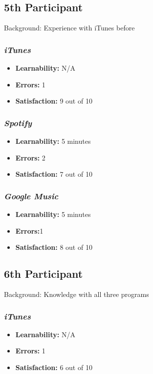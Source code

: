 \documentclass{article}
\begin{document}
{\begin{multicols}{2}
\subsection{5th Participant}
Background: Experience with iTunes before

\subsubsection{\it iTunes}
\begin{itemize}
	\item {\bf Learnability:} N/A
	\item {\bf Errors:} 1
	\item {\bf Satisfaction:} 9 out of 10 
\end{itemize}

\subsubsection{\it Spotify}
\begin{itemize}
	\item {\bf Learnability:} 5 minutes
	\item {\bf Errors:} 2
	\item {\bf Satisfaction:} 7 out of 10 
\end{itemize}

\subsubsection{\it Google Music}
\begin{itemize}
\item {\bf Learnability:} 5 minutes
	\item {\bf Errors:}1
	\item {\bf Satisfaction:} 8 out of 10 
\end{itemize}  

\subsection{6th Participant}
Background: Knowledge with all three programs

\subsubsection{\it iTunes}
\begin{itemize}
	\item {\bf Learnability:} N/A
	\item {\bf Errors:} 1
	\item {\bf Satisfaction:} 6 out of 10 
\end{itemize}


\end{multicols}}
\end{document}
